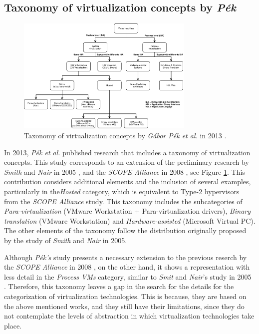 	\subsection{Taxonomy of virtualization concepts by \textit{P{\'e}k}}
	
	\begin{figure}[H]
		\centering
		\includegraphics[width=8.5cm]{images/Pek2013.pdf}
		\vspace{-0.2cm}
		\caption{Taxonomy of virtualization concepts by \textit{G{\'a}bor P{\'e}k et al.} in 2013 \cite{Pek2013}.}
		\label{fig:TaxonomyOfVirtualizationConcepts}
	\end{figure}
	
	In 2013, \textit{P{\'e}k et al.} \cite{Pek2013} published research that includes a taxonomy of virtualization concepts. This study corresponds to an extension of the preliminary research by \textit{Smith} and \textit{Nair} in 2005 \cite{Smith2005}, and the \textit{SCOPE Alliance} in 2008 \cite {SCOPEAlliance2008}, see Figure \ref{fig:TaxonomyOfVirtualizationConcepts}. This contribution considers additional elements and the inclusion of several examples, particularly in the\textit{Hosted} category, which is equivalent to Type-2 hypervisors from the \textit{SCOPE Alliance} study. This taxonomy includes the subcategories of \textit{Para-virtualization} (VMware Workstation + Para-virtualization drivers), \textit{Binary translation} (VMware Workstation) and \textit{Hardware-assisted} (Microsoft Virtual PC). The other elements of the taxonomy follow the distribution originally proposed by the study of \textit{Smith} and \textit {Nair} in 2005. 
	
	Although \textit{P{\'e}k's} study presents a necessary extension to the previous reserch by the \textit{SCOPE Alliance} in 2008 \cite{SCOPEAlliance2008}, on the other hand, it shows a representation with less detail in the \textit{Process VMs} category, similar to \textit{Smit} and \textit{Nair}'s study in 2005 \cite{Smith2005}. Therefore, this taxonomy leaves a gap in the search for the details for the categorization of virtualization technologies. This is because, they are based on the above mentioned works, and they still have their limitations, since they do not contemplate the levels of abstraction in which virtualization technologies take place.